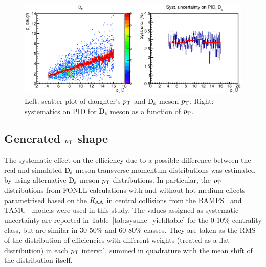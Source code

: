 \begin{figure}[!h]
 \centering
 \includegraphics[angle=0, width=13cm]{./FigCap5/PIDsystDs_MCtruth.eps}
 \caption{Left: scatter plot of daughter's $p_{\rm T}$ and ${\rm D_s}$-meson $p_{\rm T}$. Right: systematics on PID for ${\rm D_s}$ meson as a function of $p_{\rm T}$.}
 \label{fig:DsPIDsys} 
\end{figure}

\subsection{Generated $p_{\rm T}$ shape}
The systematic effect on the efficiency due to a possible difference between 
the real and simulated ${\rm D_s}$-meson transverse momentum distributions
was estimated by using alternative ${\rm D_s}$-meson $p_{\rm T}$ distributions.
In particular, the $p_{\rm T}$ distributions from FONLL calculations with
and without hot-medium effects parametrised based on the $R_{\rm AA}$ in central collisions from the 
BAMPS~\cite{Uphoff:2014hza} and TAMU~\cite{He:2014cla} models were used in this study.
The values assigned as systematic uncertainty are reported in 
Table~\ref{tab:sysunc_yieldtable} for the 0-10\% centrality class, but are similar in 
30-50\% and 60-80\% classes. They are taken as the RMS
of the distribution of efficiencies with different weights (treated as a flat distribution) 
in each $p_{\rm T}$ interval, summed in quadrature with the mean shift of the distribution itself. \\


